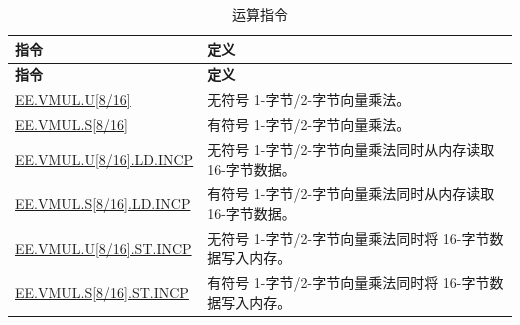 \begin{longtable}[c]{|l|m{10cm}|}
    \caption{运算指令}
    \label{tab:pie-vmul-instructions}\\
    \hline
    \rowcolor{lightgray}
    \textbf{指令} & \textbf{定义} \\\hline
    \endfirsthead
    \rowcolor{lightgray}
    \textbf{指令} & \textbf{定义} \\\hline
    \endhead
    \endfoot
    
    \hyperref[instruction:EEVMULU8]{EE.VMUL.U[8/16]} & 无符号 1-字节/2-字节向量乘法。
    \\\hline
    \hyperref[instruction:EEVMULS8]{EE.VMUL.S[8/16]} & 有符号 1-字节/2-字节向量乘法。
    \\\hline
    \hyperref[instruction:EEVMULU8LDINCP]{EE.VMUL.U[8/16].LD.INCP} & 无符号 1-字节/2-字节向量乘法同时从内存读取 16-字节数据。
    \\\hline
    \hyperref[instruction:EEVMULS8LDINCP]{EE.VMUL.S[8/16].LD.INCP} & 有符号 1-字节/2-字节向量乘法同时从内存读取 16-字节数据。
    \\\hline
    \hyperref[instruction:EEVMULU8STINCP]{EE.VMUL.U[8/16].ST.INCP} & 无符号 1-字节/2-字节向量乘法同时将 16-字节数据写入内存。
    \\\hline
    \hyperref[instruction:EEVMULS8STINCP]{EE.VMUL.S[8/16].ST.INCP} & 有符号 1-字节/2-字节向量乘法同时将 16-字节数据写入内存。
    \\\hline
\end{longtable}